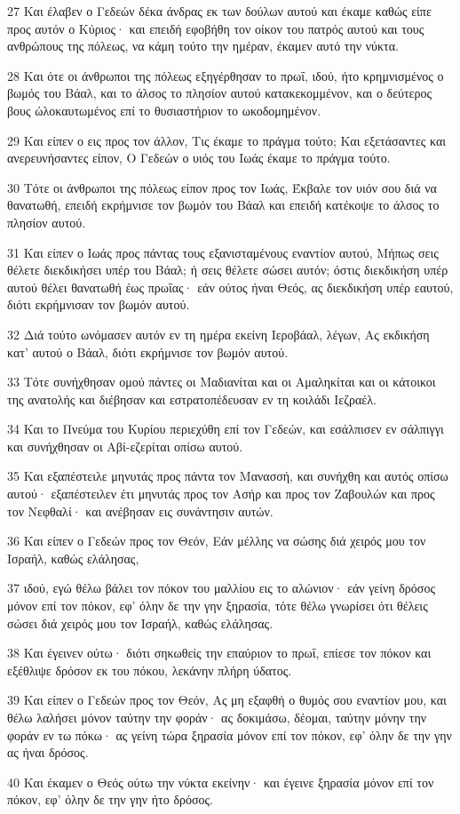 \par 27 Και έλαβεν ο Γεδεών δέκα άνδρας εκ των δούλων αυτού και έκαμε καθώς είπε προς αυτόν ο Κύριος· και επειδή εφοβήθη τον οίκον του πατρός αυτού και τους ανθρώπους της πόλεως, να κάμη τούτο την ημέραν, έκαμεν αυτό την νύκτα.
\par 28 Και ότε οι άνθρωποι της πόλεως εξηγέρθησαν το πρωΐ, ιδού, ήτο κρημνισμένος ο βωμός του Βάαλ, και το άλσος το πλησίον αυτού κατακεκομμένον, και ο δεύτερος βους ώλοκαυτωμένος επί το θυσιαστήριον το ωκοδομημένον.
\par 29 Και είπεν ο εις προς τον άλλον, Τις έκαμε το πράγμα τούτο; Και εξετάσαντες και ανερευνήσαντες είπον, Ο Γεδεών ο υιός του Ιωάς έκαμε το πράγμα τούτο.
\par 30 Τότε οι άνθρωποι της πόλεως είπον προς τον Ιωάς, Έκβαλε τον υιόν σου διά να θανατωθή, επειδή εκρήμνισε τον βωμόν του Βάαλ και επειδή κατέκοψε το άλσος το πλησίον αυτού.
\par 31 Και είπεν ο Ιωάς προς πάντας τους εξανισταμένους εναντίον αυτού, Μήπως σεις θέλετε διεκδικήσει υπέρ του Βάαλ; ή σεις θέλετε σώσει αυτόν; όστις διεκδικήση υπέρ αυτού θέλει θανατωθή έως πρωΐας· εάν ούτος ήναι Θεός, ας διεκδικήση υπέρ εαυτού, διότι εκρήμνισαν τον βωμόν αυτού.
\par 32 Διά τούτο ωνόμασεν αυτόν εν τη ημέρα εκείνη Ιεροβάαλ, λέγων, Ας εκδικήση κατ' αυτού ο Βάαλ, διότι εκρήμνισε τον βωμόν αυτού.
\par 33 Τότε συνήχθησαν ομού πάντες οι Μαδιανίται και οι Αμαληκίται και οι κάτοικοι της ανατολής και διέβησαν και εστρατοπέδευσαν εν τη κοιλάδι Ιεζραέλ.
\par 34 Και το Πνεύμα του Κυρίου περιεχύθη επί τον Γεδεών, και εσάλπισεν εν σάλπιγγι και συνήχθησαν οι Αβί-εζερίται οπίσω αυτού.
\par 35 Και εξαπέστειλε μηνυτάς προς πάντα τον Μανασσή, και συνήχθη και αυτός οπίσω αυτού· εξαπέστειλεν έτι μηνυτάς προς τον Ασήρ και προς τον Ζαβουλών και προς τον Νεφθαλί· και ανέβησαν εις συνάντησιν αυτών.
\par 36 Και είπεν ο Γεδεών προς τον Θεόν, Εάν μέλλης να σώσης διά χειρός μου τον Ισραήλ, καθώς ελάλησας,
\par 37 ιδού, εγώ θέλω βάλει τον πόκον του μαλλίου εις το αλώνιον· εάν γείνη δρόσος μόνον επί τον πόκον, εφ' όλην δε την γην ξηρασία, τότε θέλω γνωρίσει ότι θέλεις σώσει διά χειρός μου τον Ισραήλ, καθώς ελάλησας.
\par 38 Και έγεινεν ούτω· διότι σηκωθείς την επαύριον το πρωΐ, επίεσε τον πόκον και εξέθλιψε δρόσον εκ του πόκου, λεκάνην πλήρη ύδατος.
\par 39 Και είπεν ο Γεδεών προς τον Θεόν, Ας μη εξαφθή ο θυμός σου εναντίον μου, και θέλω λαλήσει μόνον ταύτην την φοράν· ας δοκιμάσω, δέομαι, ταύτην μόνην την φοράν εν τω πόκω· ας γείνη τώρα ξηρασία μόνον επί τον πόκον, εφ' όλην δε την γην ας ήναι δρόσος.
\par 40 Και έκαμεν ο Θεός ούτω την νύκτα εκείνην· και έγεινε ξηρασία μόνον επί τον πόκον, εφ' όλην δε την γην ήτο δρόσος.

